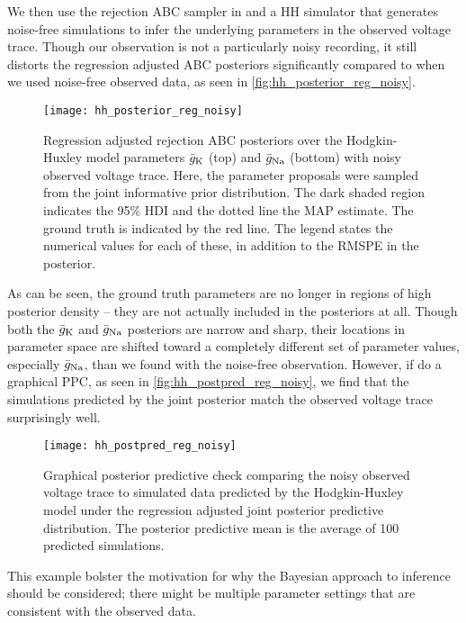 We then use the rejection ABC sampler in  and a HH simulator that generates noise-free simulations to infer the underlying parameters in the observed voltage trace. Though our observation is not a particularly noisy recording, it still distorts the regression adjusted ABC posteriors significantly compared to when we used noise-free observed data, as seen in \autoref{fig:hh_posterior_reg_noisy}.
\begin{figure}[!htb]
    \centering
    \texttt{[image: hh\_posterior\_reg\_noisy]}
    \caption{Regression adjusted rejection ABC posteriors over the Hodgkin-Huxley model parameters $\bar{g}_{\mathrm{K}}$ (top) and $\bar{g}_{\mathrm{Na}}$ (bottom) with noisy observed voltage trace. Here, the parameter proposals were sampled from the joint informative prior distribution. The dark shaded region indicates the 95\% HDI and the dotted line the MAP estimate. The ground truth is indicated by the red line. The legend states the numerical values for each of these, in addition to the RMSPE in the posterior.}
    \label{fig:hh_posterior_reg_noisy}
\end{figure} 
As can be seen, the ground truth parameters are no longer in regions of high posterior density -- they are not actually included in the posteriors at all. Though both the $\bar{g}_{\mathrm{K}}$ and $\bar{g}_{\mathrm{Na}}$ posteriors are narrow and sharp, their locations in parameter space are shifted toward a completely different set of parameter values, especially $\bar{g}_{\mathrm{Na}}$, than we found with the noise-free observation. However, if do a graphical PPC, as seen in \autoref{fig:hh_postpred_reg_noisy}, we find that the simulations predicted by the joint posterior match the observed voltage trace surprisingly well. 
\begin{figure}[!htb]
    \centering
    \texttt{[image: hh\_postpred\_reg\_noisy]}
    \caption{Graphical posterior predictive check comparing the noisy observed voltage trace to simulated data predicted by the Hodgkin-Huxley model under the regression adjusted joint posterior predictive distribution. The posterior predictive mean is the average of 100 predicted simulations.}
    \label{fig:hh_postpred_reg_noisy}
\end{figure}
This example bolster the motivation for why the Bayesian approach to inference should be considered; there might be multiple parameter settings that are consistent with the observed data.






